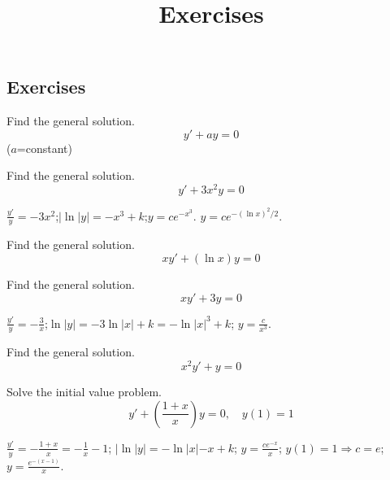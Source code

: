 \documentclass{ximera}
\title{Exercises} \license{CC BY-NC-SA 4.0}
\begin{document}
\begin{abstract}
\end{abstract}
\maketitle

\begin{onlineOnly}
\section*{Exercises}
\end{onlineOnly}


\begin{problem}\label{exer:2.1.1} Find the general solution.
$$y'+ay=0$$
($a$=constant)
\end{problem}

\begin{problem}\label{exer:2.1.2} Find the general solution.
   $$y'+3x^2y=0$$ 



\begin{solution}
    $\frac{y'}{y}=-3x^2$;\quad $|\ln|y|=-x^3+k$;\quad $y=ce^{-x^3}$.
$y=ce^{-(\ln x)^2/2}$.
\end{solution}
\end{problem}

\begin{problem}\label{exer:2.1.3} Find the general solution.
$$xy'+(\ln x)y=0$$
\end{problem}

\begin{problem}\label{exer:2.1.4} Find the general solution.
$$xy'+3y=0$$



\begin{solution}
    $\frac{y'}{y}=-\frac{3}{x}$;\quad $\ln|y|=-3\ln|x|+k=-\ln|x|^3+k$;\quad
$y=\frac{c}{x^3}$.
\end{solution}
\end{problem}

\begin{problem}\label{exer:2.1.5} Find the general solution.
$$x^2y'+y=0$$ 
\end{problem}

 \begin{problem}\label{exer:2.1.6} Solve
the initial value problem.
$$y'+\left(\frac{1+x}{x}\right)y=0,\quad y(1)=1$$



\begin{solution}
    $\frac{y'}{y}=-\frac{1+x}{x}=-\frac{1}{x}-1$;\quad
$|\ln|y|=-\ln|x|-x+k$;\quad
$y=\frac{ce^{-x}}{x}$;\quad
$y(1)=1\Rightarrow
 c=e$;\quad
$y=\frac{e^{-(x-1)}}{x}$.
\end{solution}
\end{problem}
\end{document}
